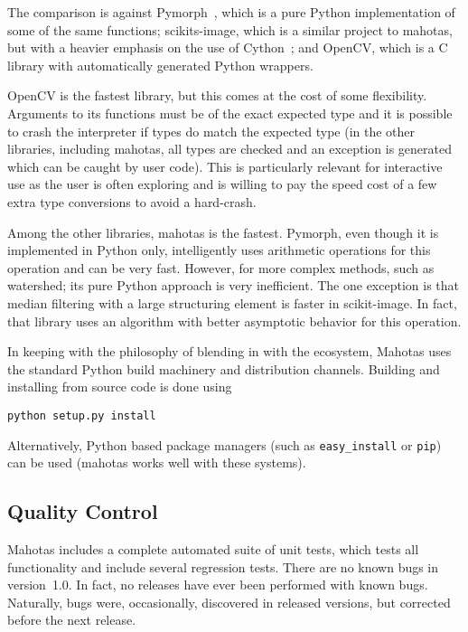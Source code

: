 \documentclass{scrartcl}
\newcommand*{\cpp}{{C\nolinebreak[4]\hspace{-.05em}\raisebox{.4ex}{\tiny\textbf{++}}}}
\begin{document}
The comparison is against Pymorph~\citep{DougLotu:03}, which is a pure Python
implementation of some of the same functions; scikits-image, which is a similar
project to mahotas, but with a heavier emphasis on the use of
Cython~\citep{Cython}; and OpenCV, which is a \cpp{} library with automatically
generated Python wrappers.

OpenCV is the fastest library, but this comes at the cost of some flexibility.
Arguments to its functions must be of the exact expected type and it is
possible to crash the interpreter if types do match the expected type (in the
other libraries, including mahotas, all types are checked and an exception is
generated which can be caught by user code). This is particularly relevant for
interactive use as the user is often exploring and is willing to pay the speed
cost of a few extra type conversions to avoid a hard-crash.

Among the other libraries, mahotas is the fastest. Pymorph, even though it is
implemented in Python only, intelligently uses arithmetic operations for this
operation and can be very fast. However, for more complex methods, such as
watershed; its pure Python approach is very inefficient. The one exception is
that median filtering with a large structuring element is faster in
scikit-image. In fact, that library uses an algorithm with better asymptotic
behavior for this operation.

\bigskip

In keeping with the philosophy of blending in with the ecosystem, Mahotas uses
the standard Python build machinery and distribution channels. Building and
installing from source code is done using
\begin{verbatim}
python setup.py install
\end{verbatim}
Alternatively, Python based package managers (such as \texttt{easy\_install} or
\texttt{pip}) can be used (mahotas works well with these systems).

\subsection{Quality Control}

Mahotas includes a complete automated suite of unit tests, which tests all
functionality and include several regression tests. There are no known bugs in
version~1.0. In fact, no releases have ever been performed with known bugs.
Naturally, bugs were, occasionally, discovered in released versions, but
corrected before the next release.
\end{document}
